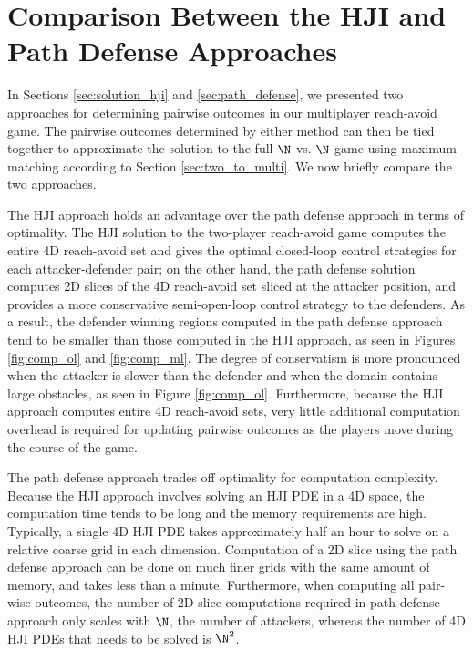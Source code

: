 \section{Comparison Between the HJI and Path Defense Approaches}
\label{sec:comparison}
In Sections \ref{sec:solution_hji} and \ref{sec:path_defense}, we presented two approaches for determining pairwise outcomes in our multiplayer reach-avoid game. The pairwise outcomes determined by either method can then be tied together to approximate the solution to the full $\N$ vs. $\N$ game using maximum matching according to Section \ref{sec:two_to_multi}. We now briefly compare the two approaches.

The HJI approach holds an advantage over the path defense approach in terms of optimality. The HJI solution to the two-player reach-avoid game computes the entire 4D reach-avoid set and gives the optimal closed-loop control strategies for each attacker-defender pair; on the other hand, the path defense solution computes 2D slices of the 4D reach-avoid set sliced at the attacker position, and provides a more conservative semi-open-loop control strategy to the defenders. As a result, the defender winning regions computed in the path defense approach tend to be smaller than those computed in the HJI approach, as seen in Figures \ref{fig:comp_ol} and \ref{fig:comp_ml}. The degree of conservatism is more pronounced when the attacker is slower than the defender and when the domain contains large obstacles, as seen in Figure \ref{fig:comp_ol}. Furthermore, because the HJI approach computes entire 4D reach-avoid sets, very little additional computation overhead is required for updating pairwise outcomes as the players move during the course of the game.

The path defense approach trades off optimality for computation complexity. Because the HJI approach involves solving an HJI PDE in a 4D space, the computation time tends to be long and the memory requirements are high. Typically, a single 4D HJI PDE takes approximately half an hour to solve on a relative coarse grid in each dimension. Computation of a 2D slice using the path defense approach can be done on much finer grids with the same amount of memory, and takes less than a minute. Furthermore, when computing all pair-wise outcomes, the number of 2D slice computations required in path defense approach only scales with $\N$, the number of attackers, whereas the number of 4D HJI PDEs that needs to be solved is $\N^2$.
